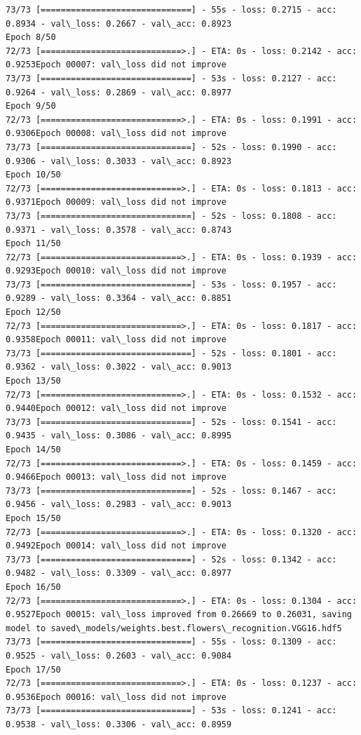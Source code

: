 \documentclass[11pt]{article}
\begin{document}
\begin{Verbatim}[commandchars=\\\{\}]
73/73 [==============================] - 55s - loss: 0.2715 - acc: 0.8934 - val\_loss: 0.2667 - val\_acc: 0.8923
Epoch 8/50
72/73 [============================>.] - ETA: 0s - loss: 0.2142 - acc: 0.9253Epoch 00007: val\_loss did not improve
73/73 [==============================] - 53s - loss: 0.2127 - acc: 0.9264 - val\_loss: 0.2869 - val\_acc: 0.8977
Epoch 9/50
72/73 [============================>.] - ETA: 0s - loss: 0.1991 - acc: 0.9306Epoch 00008: val\_loss did not improve
73/73 [==============================] - 52s - loss: 0.1990 - acc: 0.9306 - val\_loss: 0.3033 - val\_acc: 0.8923
Epoch 10/50
72/73 [============================>.] - ETA: 0s - loss: 0.1813 - acc: 0.9371Epoch 00009: val\_loss did not improve
73/73 [==============================] - 52s - loss: 0.1808 - acc: 0.9371 - val\_loss: 0.3578 - val\_acc: 0.8743
Epoch 11/50
72/73 [============================>.] - ETA: 0s - loss: 0.1939 - acc: 0.9293Epoch 00010: val\_loss did not improve
73/73 [==============================] - 53s - loss: 0.1957 - acc: 0.9289 - val\_loss: 0.3364 - val\_acc: 0.8851
Epoch 12/50
72/73 [============================>.] - ETA: 0s - loss: 0.1817 - acc: 0.9358Epoch 00011: val\_loss did not improve
73/73 [==============================] - 52s - loss: 0.1801 - acc: 0.9362 - val\_loss: 0.3022 - val\_acc: 0.9013
Epoch 13/50
72/73 [============================>.] - ETA: 0s - loss: 0.1532 - acc: 0.9440Epoch 00012: val\_loss did not improve
73/73 [==============================] - 52s - loss: 0.1541 - acc: 0.9435 - val\_loss: 0.3086 - val\_acc: 0.8995
Epoch 14/50
72/73 [============================>.] - ETA: 0s - loss: 0.1459 - acc: 0.9466Epoch 00013: val\_loss did not improve
73/73 [==============================] - 52s - loss: 0.1467 - acc: 0.9456 - val\_loss: 0.2983 - val\_acc: 0.9013
Epoch 15/50
72/73 [============================>.] - ETA: 0s - loss: 0.1320 - acc: 0.9492Epoch 00014: val\_loss did not improve
73/73 [==============================] - 52s - loss: 0.1342 - acc: 0.9482 - val\_loss: 0.3309 - val\_acc: 0.8977
Epoch 16/50
72/73 [============================>.] - ETA: 0s - loss: 0.1304 - acc: 0.9527Epoch 00015: val\_loss improved from 0.26669 to 0.26031, saving model to saved\_models/weights.best.flowers\_recognition.VGG16.hdf5
73/73 [==============================] - 55s - loss: 0.1309 - acc: 0.9525 - val\_loss: 0.2603 - val\_acc: 0.9084
Epoch 17/50
72/73 [============================>.] - ETA: 0s - loss: 0.1237 - acc: 0.9536Epoch 00016: val\_loss did not improve
73/73 [==============================] - 53s - loss: 0.1241 - acc: 0.9538 - val\_loss: 0.3306 - val\_acc: 0.8959

\end{Verbatim}
\end{document}
